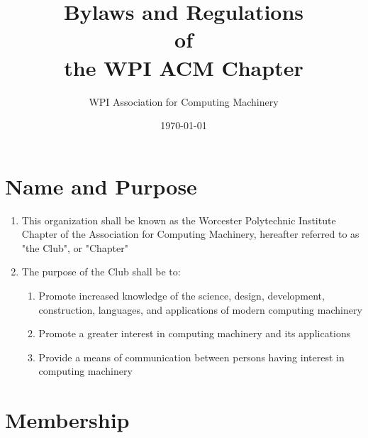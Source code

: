 \documentclass[12pt, letterpaper, oneside]{book}
\title{Bylaws and Regulations \\ of \\ the WPI ACM Chapter}
\author{WPI Association for Computing Machinery}
\date{\today}
\begin{document}
\maketitle

\tableofcontents
\newpage

\renewcommand{\chaptername}{Article}

\chapter{Name and Purpose}
\begin{enumerate}
    \item This organization shall be known as the Worcester Polytechnic
        Institute Chapter of the Association for Computing Machinery, hereafter
        referred to as "the Club", or "Chapter"
    \item The purpose of the Club shall be to:
        \begin{enumerate}
            \item Promote increased knowledge of the science, design,
                development, construction, languages, and applications of modern
                computing machinery
            \item Promote a greater interest in computing machinery and its
                applications
            \item Provide a means of communication between persons having
                interest in computing machinery
        \end{enumerate}
\end{enumerate}

\chapter{Membership}
\end{document}
